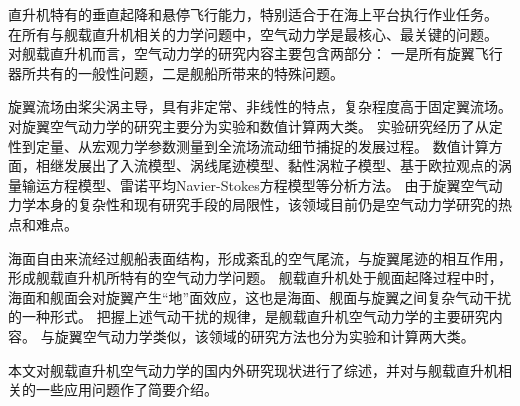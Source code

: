 \begin{cabstract}
直升机特有的垂直起降和悬停飞行能力，特别适合于在海上平台执行作业任务。
在所有与舰载直升机相关的力学问题中，空气动力学是最核心、最关键的问题。
对舰载直升机而言，空气动力学的研究内容主要包含两部分：
一是所有旋翼飞行器所共有的一般性问题，二是舰船所带来的特殊问题。

旋翼流场由桨尖涡主导，具有非定常、非线性的特点，复杂程度高于固定翼流场。
对旋翼空气动力学的研究主要分为实验和数值计算两大类。
实验研究经历了从定性到定量、从宏观力学参数测量到全流场流动细节捕捉的发展过程。
数值计算方面，相继发展出了入流模型、涡线尾迹模型、黏性涡粒子模型、基于欧拉观点的涡量输运方程模型、雷诺平均Navier-Stokes方程模型等分析方法。
由于旋翼空气动力学本身的复杂性和现有研究手段的局限性，该领域目前仍是空气动力学研究的热点和难点。

海面自由来流经过舰船表面结构，形成紊乱的空气尾流，与旋翼尾迹的相互作用，形成舰载直升机所特有的空气动力学问题。
舰载直升机处于舰面起降过程中时，海面和舰面会对旋翼产生“地”面效应，这也是海面、舰面与旋翼之间复杂气动干扰的一种形式。
把握上述气动干扰的规律，是舰载直升机空气动力学的主要研究内容。
与旋翼空气动力学类似，该领域的研究方法也分为实验和计算两大类。

本文对舰载直升机空气动力学的国内外研究现状进行了综述，并对与舰载直升机相关的一些应用问题作了简要介绍。
\end{cabstract}
%
